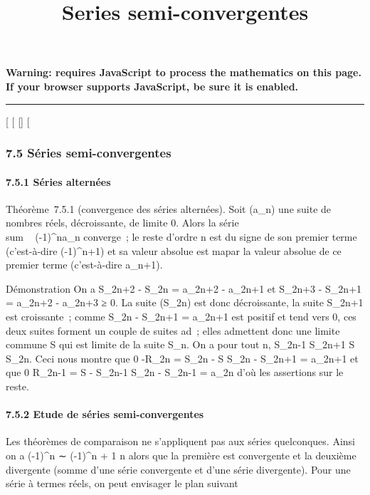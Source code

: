 \documentclass[]{article}
\title{Series semi-convergentes}
\author{}
\date{}
\begin{document}
\maketitle

\textbf{Warning: 
requires JavaScript to process the mathematics on this page.\\ If your
browser supports JavaScript, be sure it is enabled.}

\begin{center}\rule{3in}{0.4pt}\end{center}

{[}
{[}
{[}{]}
{[}

\subsubsection{7.5 Séries semi-convergentes}

\paragraph{7.5.1 Séries alternées}

Théorème~7.5.1 (convergence des séries alternées). Soit (a\_n)
une suite de nombres réels, décroissante, de limite 0. Alors la série
\\sum ~
(-1)^na\_n converge~; le reste d'ordre n est du signe
de son premier terme (c'est-à-dire (-1)^n+1) et sa valeur
absolue est ma par la valeur absolue de ce premier terme
(c'est-à-dire a\_n+1).

Démonstration On a S\_2n+2 - S\_2n = a\_2n+2 -
a\_2n+1  et S\_2n+3 - S\_2n+1 =
a\_2n+2 - a\_2n+3 ≥ 0. La suite (S\_2n) est donc
décroissante, la suite S\_2n+1 est croissante~; comme
S\_2n - S\_2n+1 = a\_2n+1 est positif et tend
vers 0, ces deux suites forment un couple de suites ad\jmathacentes~; elles
admettent donc une limite commune S qui est limite de la suite
S\_n. On a pour tout n, S\_2n-1 \leq S\_2n+1 \leq S \leq
S\_2n. Ceci nous montre que 0 \leq-R\_2n = S\_2n -
S \leq S\_2n - S\_2n+1 = a\_2n+1 et que 0 \leq
R\_2n-1 = S - S\_2n-1 \leq S\_2n - S\_2n-1
= a\_2n d'où les assertions sur le reste.

\paragraph{7.5.2 Etude de séries semi-convergentes}

Les théorèmes de comparaison ne s'appliquent pas aux séries quelconques.
Ainsi on a  (-1)^n \over
\sqrtn ∼ (-1)^n \over
\sqrtn + 1 \over n alors que la
première est convergente et la deuxième divergente (somme d'une série
convergente et d'une série divergente). Pour une série à termes réels,
on peut envisager le plan suivant
\end{document}
